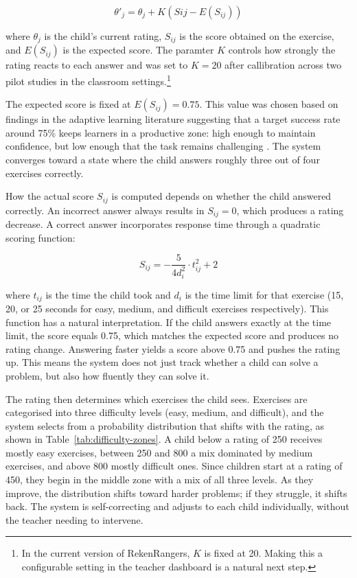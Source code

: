 \begin{equation}
\theta'_j = \theta_j + K(S{ij} - E(S_{ij}))
\end{equation}

where \(\theta_j\) is the child's current rating, \(S_{ij}\) is the score obtained on the exercise, and \(E(S_{ij})\) is the expected score. The paramter \(K\) controls how strongly the rating reacts to each answer and was set to \(K = 20\) after callibration across two pilot studies in the classroom settings.\footnote{In the current version of RekenRangers, \(K\) is fixed at 20. Making this a configurable setting in the teacher dashboard is a natural next step.}

The expected score is fixed at \(E(S_{ij}) = 0.75\). This value was chosen based on findings in the adaptive learning literature suggesting that a target success rate around 75\% keeps learners in a productive zone: high enough to maintain confidence, but low enough that the task remains challenging \cite{klinkenberg2011computer}. The system converges toward a state where the child answers roughly three out of four exercises correctly.

How the actual score \(S_{ij}\) is computed depends on whether the child answered correctly. An incorrect answer always results in \(S_{ij} = 0\), which produces a rating decrease. A correct answer incorporates response time through a quadratic scoring function:

\begin{equation}
\label{for:scoring-function}
S_{ij} = -\frac{5}{4d_i^2} \cdot t_{ij}^2 + 2
\end{equation}

where \(t_{ij}\) is the time the child took and \(d_i\) is the time limit for that exercise (15, 20, or 25 seconds for easy, medium, and difficult exercises respectively). This function has a natural interpretation. If the child answers exactly at the time limit, the score equals 0.75, which matches the expected score and produces no rating change. Answering faster yields a score above 0.75 and pushes the rating up. This means the system does not just track whether a child can solve a problem, but also how fluently they can solve it.

The rating then determines which exercises the child sees. Exercises are categorised into three difficulty levels (easy, medium, and difficult), and the system selects from a probability distribution that shifts with the rating, as shown in Table~\ref{tab:difficulty-zones}. A child below a rating of 250 receives mostly easy exercises, between 250 and 800 a mix dominated by medium exercises, and above 800 mostly difficult ones. Since children start at a rating of 450, they begin in the middle zone with a mix of all three levels. As they improve, the distribution shifts toward harder problems; if they struggle, it shifts back. The system is self-correcting and adjusts to each child individually, without the teacher needing to intervene.


